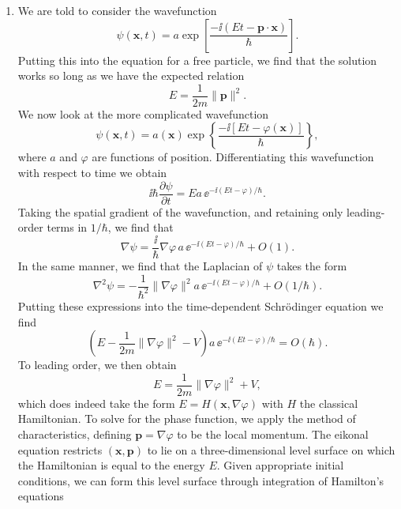 \documentclass[a4paper,10pt]{paper}
\begin{document}
\begin{enumerate}
\item We are told to consider the wavefunction
\begin{equation*}
    \psi(\mathbf{x},t)=a\exp\left[\frac{-\ii(E t-\mathbf{p}\cdot\mathbf{x})}{\hbar}\right].
\end{equation*}
Putting this into the equation for a free particle, we find that the solution works so long as we have the expected relation
\begin{equation*}
    E=\frac{1}{2m}\|\mathbf{p}\|^{2}.
\end{equation*}
We now look at the more complicated wavefunction
\begin{equation*}
    \psi(\mathbf{x},t)=a(\mathbf{x})\exp\left\{\frac{-\ii[E t-\varphi(\mathbf{x})]}{\hbar}\right\},
\end{equation*}
where $a$ and $\varphi$ are functions of position. Differentiating this wavefunction with respect to time we obtain
\begin{equation*}
    \ii\hbar\frac{\partial\psi}{\partial t}=E a\,\ee^{-\ii(Et-\varphi)/\hbar}.
\end{equation*}
Taking the spatial gradient of the wavefunction, and retaining only leading-order terms in $1/\hbar$, we find that
\begin{equation*}
    \nabla\psi=\frac{\ii}{\hbar}\nabla\varphi\,a\,\ee^{-\ii(Et-\varphi)/\hbar}+O(1).
\end{equation*}
In the same manner, we find that the Laplacian of $\psi$ takes the form
\begin{equation*}
    \nabla^{2}\psi=-\frac{1}{\hbar^{2}}\|\nabla\varphi\|^{2}a\,\ee^{-\ii(Et-\varphi)/\hbar}+O(1/\hbar).
\end{equation*}
Putting these expressions into the time-dependent Schrödinger equation we find
\begin{equation*}
    \left(E-\frac{1}{2m}\|\nabla\varphi\|^{2}-V\right)a\,\ee^{-\ii(Et-\varphi)/\hbar}=O(\hbar).
\end{equation*}
To leading order, we then obtain
\begin{equation*}
    E=\frac{1}{2m}\|\nabla\varphi\|^{2}+V,
\end{equation*}
which does indeed take the form $E=H(\mathbf{x},\nabla\varphi)$ with $H$ the classical Hamiltonian. To solve for the phase function, we apply the method of characteristics, defining $\mathbf{p}=\nabla\varphi$ to be the local momentum. The eikonal equation restricts $(\mathbf{x}, \mathbf{p})$ to lie on a three-dimensional level surface on which the Hamiltonian is equal to the energy $E$. Given appropriate initial conditions, we can form this level surface through integration of Hamilton's equations

\end{enumerate}
\end{document}
